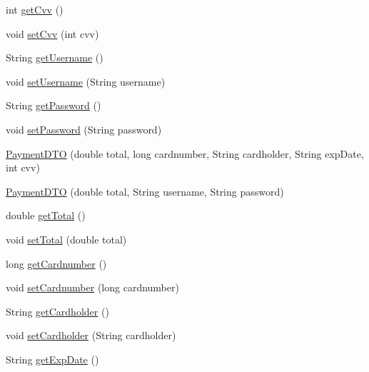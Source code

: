\begin{DoxyCompactItemize}
\item 
int \mbox{\hyperlink{class_s_p_q_1_1dto_1_1_payment_d_t_o_a64fb9df59333fcc2a0c8bea48024354d}{get\+Cvv}} ()
\item 
void \mbox{\hyperlink{class_s_p_q_1_1dto_1_1_payment_d_t_o_aee98ca86c3d7e05f98e387faa4f5a3d4}{set\+Cvv}} (int cvv)
\item 
String \mbox{\hyperlink{class_s_p_q_1_1dto_1_1_payment_d_t_o_a31d0edbb3ec64b406e70cd3deaa5ab1a}{get\+Username}} ()
\item 
void \mbox{\hyperlink{class_s_p_q_1_1dto_1_1_payment_d_t_o_aaad1620f8f86cb26566476c22bfcd3af}{set\+Username}} (String username)
\item 
String \mbox{\hyperlink{class_s_p_q_1_1dto_1_1_payment_d_t_o_ae012449dd0baea7f169bb64dcf973dec}{get\+Password}} ()
\item 
void \mbox{\hyperlink{class_s_p_q_1_1dto_1_1_payment_d_t_o_a51a5daa487df2578ca39ede7ae705fb6}{set\+Password}} (String password)
\item 
\mbox{\hyperlink{class_s_p_q_1_1dto_1_1_payment_d_t_o_a4a6f91d0976ce0af97a8f7f15658294c}{Payment\+D\+TO}} (double total, long cardnumber, String cardholder, String exp\+Date, int cvv)
\item 
\mbox{\hyperlink{class_s_p_q_1_1dto_1_1_payment_d_t_o_ab51beb9eef60e0b57b11bab85ce42454}{Payment\+D\+TO}} (double total, String username, String password)
\item 
double \mbox{\hyperlink{class_s_p_q_1_1dto_1_1_payment_d_t_o_a04cd2104d07971407126fcf75ef17d5b}{get\+Total}} ()
\item 
void \mbox{\hyperlink{class_s_p_q_1_1dto_1_1_payment_d_t_o_a07f242511a5b2cd45fdf771203729c1b}{set\+Total}} (double total)
\item 
long \mbox{\hyperlink{class_s_p_q_1_1dto_1_1_payment_d_t_o_ac2a8a2ab315f3027f25780a84da0b824}{get\+Cardnumber}} ()
\item 
void \mbox{\hyperlink{class_s_p_q_1_1dto_1_1_payment_d_t_o_a2b84f1e7da9d3d9966d5170ae0595839}{set\+Cardnumber}} (long cardnumber)
\item 
String \mbox{\hyperlink{class_s_p_q_1_1dto_1_1_payment_d_t_o_ac4812465bc4dd874aad6269fe8486e0b}{get\+Cardholder}} ()
\item 
void \mbox{\hyperlink{class_s_p_q_1_1dto_1_1_payment_d_t_o_a5eea0a93b97ba73b36358c6f5e0ca42e}{set\+Cardholder}} (String cardholder)
\item 
String \mbox{\hyperlink{class_s_p_q_1_1dto_1_1_payment_d_t_o_aa91402a8c96a306fcf125973e4f35912}{get\+Exp\+Date}} ()
\item 

\end{DoxyCompactItemize}
